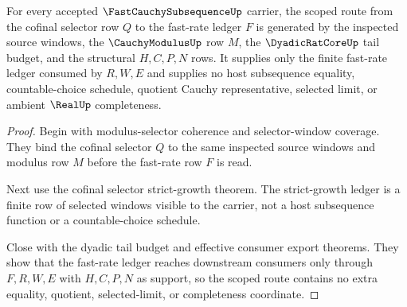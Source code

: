 \begin{theorem}
\label{thm:fast-cauchy-subsequence-cofinal-fast-rate-scope}
For every accepted $\FastCauchySubsequenceUp$ carrier, the scoped route from the cofinal selector row $Q$ to the fast-rate ledger $F$ is generated by the inspected source windows, the $\CauchyModulusUp$ row $M$, the $\DyadicRatCoreUp$ tail budget, and the structural $H,C,P,N$ rows. It supplies only the finite fast-rate ledger consumed by $R,W,E$ and supplies no host subsequence equality, countable-choice schedule, quotient Cauchy representative, selected limit, or ambient $\RealUp$ completeness.
\end{theorem}
\begin{proof}
Begin with modulus-selector coherence and selector-window coverage. They bind the cofinal selector $Q$ to the same inspected source windows and modulus row $M$ before the fast-rate row $F$ is read.

Next use the cofinal selector strict-growth theorem. The strict-growth ledger is a finite row of selected windows visible to the carrier, not a host subsequence function or a countable-choice schedule.

Close with the dyadic tail budget and effective consumer export theorems. They show that the fast-rate ledger reaches downstream consumers only through $F,R,W,E$ with $H,C,P,N$ as support, so the scoped route contains no extra equality, quotient, selected-limit, or completeness coordinate.
\end{proof}

